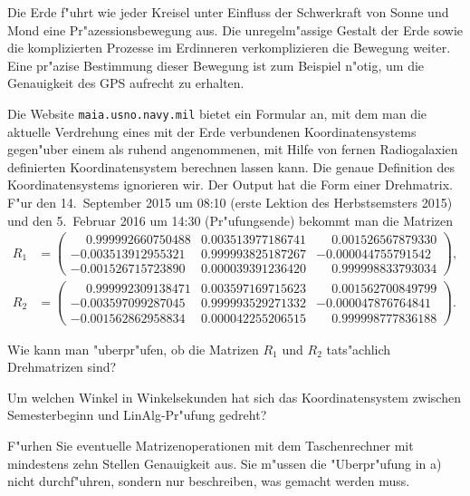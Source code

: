 Die Erde f"uhrt wie jeder Kreisel unter Einfluss der Schwerkraft von
Sonne und Mond eine Pr"azessionsbewegung aus.
Die unregelm"assige Gestalt der Erde sowie die komplizierten Prozesse
im Erdinneren verkomplizieren die Bewegung weiter.
Eine pr"azise Bestimmung dieser Bewegung ist zum Beispiel n"otig, um
die Genauigkeit des GPS aufrecht zu erhalten.

Die Website \texttt{maia.usno.navy.mil} bietet
ein Formular an, mit dem man die aktuelle Verdrehung eines
mit der Erde verbundenen Koordinatensystems gegen"uber einem als
ruhend angenommenen, mit Hilfe von fernen Radiogalaxien definierten
Koordinatensystem berechnen lassen kann.
Die genaue Definition des Koordinatensystems ignorieren wir.
Der Output hat die Form einer Drehmatrix.
F"ur den 14.~September 2015 um 08:10 (erste Lektion des Herbstsemsters 2015)
und den 5.~Februar 2016 um 14:30 (Pr"ufungsende) bekommt man die Matrizen
\begin{align*}
R_1 &= \begin{pmatrix}
\phantom{-}0.999992660750488&0.003513977186741&\phantom{-}0.001526567879330\\
          -0.003513912955321&0.999993825187267&          -0.000044755791542\\
          -0.001526715723890&0.000039391236420&\phantom{-}0.999998833793034
\end{pmatrix},
\tag{2015-09-14 08:10}
\\
R_2 &= \begin{pmatrix}
\phantom{-}0.999992309138471&0.003597169715623&\phantom{-}0.001562700849799\\
          -0.003597099287045&0.999993529271332&          -0.000047876764841\\
          -0.001562862958834&0.000042255206515&\phantom{-}0.999998777836188
\end{pmatrix}.
\tag{2016-02-05 14:30}
\end{align*}
\begin{teilaufgaben}
\item
Wie kann man "uberpr"ufen, ob die Matrizen $R_1$ und $R_2$ tats"achlich
Drehmatrizen sind?
\item
Um welchen Winkel in Winkelsekunden hat sich das Koordinatensystem
zwischen Semesterbeginn und LinAlg-Pr"ufung gedreht?
\end{teilaufgaben}

\begin{hinweis}
F"urhen Sie eventuelle Matrizenoperationen mit dem Taschenrechner
mit mindestens zehn Stellen Genauigkeit aus.
Sie m"ussen die "Uberpr"ufung in a) nicht durchf"uhren, sondern nur
beschreiben, was gemacht werden muss.
\end{hinweis}

